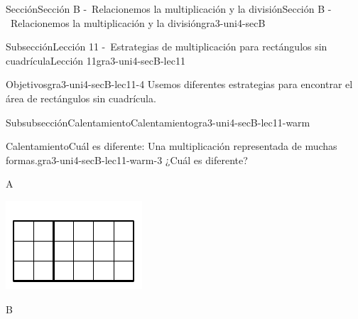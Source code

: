 \documentclass[twoside,10pt,]{article}
\begin{document}
\begin{sectionptx}{Sección}{Sección B -~Relacionemos la multiplicación y la división}{}{Sección B -~Relacionemos la multiplicación y la división}{}{}{gra3-uni4-secB}
\typeout{************************************************}
%
\begin{subsectionptx}{Subsección}{Lección 11 -~Estrategias de multiplicación para rectángulos sin cuadrícula}{}{Lección 11}{}{}{gra3-uni4-secB-lec11}
\begin{objectives}{Objetivos}{gra3-uni4-secB-lec11-4}
Usemos diferentes estrategias para encontrar el área de rectángulos sin cuadrícula.%
\end{objectives}
%
%
\typeout{************************************************}
\typeout{************************************************}
%
\begin{subsubsectionptx}{Subsubsección}{Calentamiento}{}{Calentamiento}{}{}{gra3-uni4-secB-lec11-warm}
\begin{exploration}{Calentamiento}{Cuál es diferente: Una multiplicación representada de muchas formas.}{gra3-uni4-secB-lec11-warm-3}%
¿Cuál es diferente?%
\begin{sidebyside}{2}{0.05}{0.05}{0.1}%
\begin{sbspanel}{0.4}%
A%
\par
\includegraphics[width=\linewidth]{external/svg-source/tikz-file-153081.pdf}
\end{sbspanel}%
\begin{sbspanel}{0.4}%
B%
\par

\end{sbspanel}
\end{sidebyside}
\end{exploration}
\end{subsubsectionptx}
\end{subsectionptx}
\end{sectionptx}
\end{document}
